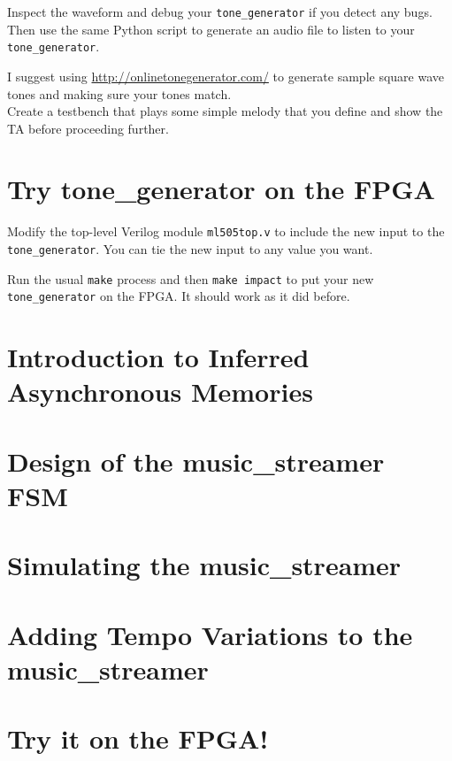 \documentclass[11pt]{article}
\begin{document}
Inspect the waveform and debug your \verb|tone_generator| if you detect any bugs. Then use the same Python script to generate an audio file to listen to your \verb|tone_generator|.

I suggest using \url{http://onlinetonegenerator.com/} to generate sample square wave tones and making sure your tones match.\\

Create a testbench that plays some simple melody that you define and show the TA before proceeding further.

\section{Try tone\_generator on the FPGA}
Modify the top-level Verilog module \verb|ml505top.v| to include the new input to the \verb|tone_generator|. You can tie the new input to any value you want.

Run the usual \verb|make| process and then \verb|make impact| to put your new \verb|tone_generator| on the FPGA. It should work as it did before.

\section{Introduction to Inferred Asynchronous Memories}



\section{Design of the music\_streamer FSM}

\section{Simulating the music\_streamer}

\section{Adding Tempo Variations to the music\_streamer}

\section{Try it on the FPGA!}
\end{document}

